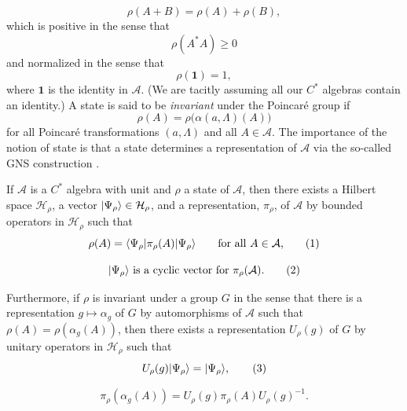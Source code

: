 \begin{equation*}
  \rho(A+B)=\rho(A)+\rho(B),
\end{equation*}
which is positive in the sense that
\begin{equation*}
  \rho(A^*A)\geq0
\end{equation*}
and normalized in the sense that
\begin{equation*}
  \rho(\mathbf 1)=1,
\end{equation*}
where $\mathbf 1$ is the identity in $\mathcal A$.  (We are tacitly
assuming all our $C^*$ algebras contain an identity.)  A state is said to be
\emph{invariant} under the Poincar\'e group if
\begin{equation*}
  \rho(A)=\rho\bigl(\alpha(a,\Lambda)(A)\bigr)
\end{equation*}
for all Poincar\'e transformations $(a,\Lambda)$ and all $A\in\mathcal A$.
The importance of the notion of state is that a state determines a
representation of $\mathcal A$ via the so-called GNS construction \cite{pct-app-68}.

\begin{theorem*}
If $\mathcal A$ is a $C^*$ algebra with unit and $\rho$ a state of $\mathcal A$,
then there exists a Hilbert space $\mathcal H_\rho$, a vector
$\lvert \Psi_\rho\rangle\in\mathcal H_\rho$, and a representation, $\pi_\rho$, of
$\mathcal A$ by bounded operators in $\mathcal H_\rho$ such that
\begin{equation}
  \rho(A)=\langle \Psi_\rho\vert \pi_\rho(A)\vert \Psi_\rho\rangle
  \qquad\text{for all $A\in\mathcal A$,}
  \tag{1}\label{eq:app-gns-1}
\end{equation}

\begin{equation}
  \lvert \Psi_\rho\rangle\text{ is a cyclic vector for }\pi_\rho(\mathcal A).
  \tag{2}\label{eq:app-gns-2}
\end{equation}

Furthermore, if $\rho$ is invariant under a group $G$ in the sense that there
is a representation $g\mapsto\alpha_g$ of $G$ by automorphisms
of $\mathcal A$
such that $\rho(A)=\rho(\alpha_g(A))$, then there exists a representation
$U_\rho(g)$ of $G$ by unitary operators in $\mathcal H_\rho$ such that
\begin{equation}
  U_\rho(g)\lvert \Psi_\rho\rangle=\lvert \Psi_\rho\rangle,
  \tag{3}\label{eq:app-gns-3}
\end{equation}

\begin{equation}
  \pi_\rho(\alpha_g(A))
  =U_\rho(g)\pi_\rho(A)U_\rho(g)^{-1}.
  \tag{4}\label{eq:app-gns-4}
\end{equation}
\end{theorem*}

